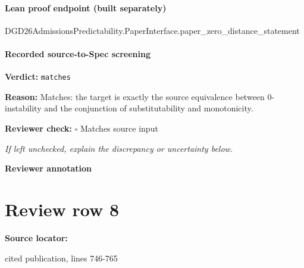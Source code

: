 \documentclass[10pt]{article}
\newcommand{\reviewerbox}{%
  \par\noindent\fbox{\parbox{0.96\linewidth}{\rule{0pt}{0.38in}}}\par
}
\newcommand{\reviewmatch}[1]{%
  \par\noindent\textbf{Reviewer check:} $\square$\; #1\par
  \noindent\emph{If left unchecked, explain the discrepancy or uncertainty below.}\par
}
\begin{document}
\paragraph{Lean proof endpoint (built separately)}\begin{ReviewVerbatim}
DGD26AdmissionsPredictability.PaperInterface.paper_zero_distance_statement
\end{ReviewVerbatim}

\paragraph{Recorded source-to-Spec screening}
\textbf{Verdict:} \texttt{matches}
\\
{\raggedright
\textbf{Reason:} Matches:\allowbreak{} the target is exactly the source equivalence between 0-\allowbreak{}instability and the conjunction of substitutability and monotonicity.\allowbreak{}
\par}
\reviewmatch{Matches source input}
\noindent\textbf{Reviewer annotation}\par
\reviewerbox
\clearpage
\hypertarget{source-claim-760d01f2c31e3672}{}
\section*{Review row 8}
\textbf{Source locator:} {\footnotesize\raggedright cited publication, lines 746-\allowbreak{}765\par}
\end{document}
